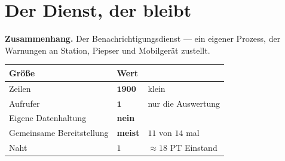\chapter{Der Dienst, der bleibt}\label{fall:dienst}

\begin{merksatz}
\textbf{Zusammenhang.} Der Benachrichtigungsdienst --- ein eigener Prozess, der Warnungen an Station, Piepser und Mobilgerät zustellt.

\begin{center}
{\small
\renewcommand{\arraystretch}{1.45}
\begin{tabular}{@{}P{3.0cm}P{2.2cm}P{2.6cm}@{}}
\toprule
\textbf{Größe} & \textbf{Wert} & \\
\midrule
Zeilen & $\mathbf{1900}$ & \textcolor{mittel}{klein}\\
Aufrufer & $\mathbf{1}$ & \textcolor{akzent}{nur die Auswertung}\\
Eigene Datenhaltung & \textcolor{akzent}{\textbf{nein}} & \\
Gemeinsame Bereitstellung & \textcolor{akzent}{\textbf{meist}} & \textcolor{akzent}{$11$ von $14$ mal}\\
Naht & $1$ & $\approx18$ PT Einstand\\
\bottomrule
\end{tabular}}
\end{center}

\begin{center}
\begin{minipage}{0.88\textwidth}
\end{minipage}
\end{center}
\end{merksatz}

